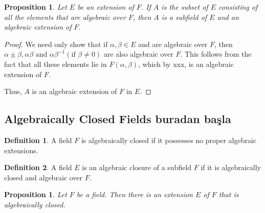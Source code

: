 \documentclass[draft]{article}
\newtheorem{prop}[thm]{Proposition}
\theoremstyle{definition}
\newtheorem{defn}{Definition}[section]
\theoremstyle{remark}
\begin{document}
            \begin{prop}
                Let $E$ be an extension of $F$. If $A$ is the subset of $E$ consisting of all the elements that are algebraic over $F$, then $A$ is a subfield of $E$ and an algebraic extension of $F$.
            \end{prop}
            
            \begin{proof}
                We need only show that if $\alpha, \beta \in E$ and are algebraic over $F$, then $\alpha \pm \beta, \alpha\beta \text{ and } \alpha\beta^{-1} (\text{if } \beta \neq 0)$ are also algebraic over $F$. This follows from the fact that all these elements lie in $F(\alpha, \beta)$, which by xxx, is an algebraic extension of $F$.\par
                Thus, $A$ is an algebraic extension of $F$ in $E$.
            \end{proof}
            
        \subsection{Algebraically Closed Fields buradan başla}
        
            \begin{defn}
                A field $F$ is algebraically closed if it possesses no proper algebraic extensions.
            \end{defn}
            
            \begin{defn}
                A field $E$ is an algebraic closure of a subfield $F$ if it is algebraically closed and algebraic over $F$.
            \end{defn}
            
            \begin{prop}
                Let $F$ be a field. Then there is an extension $E$ of $F$ that is algebraically closed.
            \end{prop}
            
\end{document}
